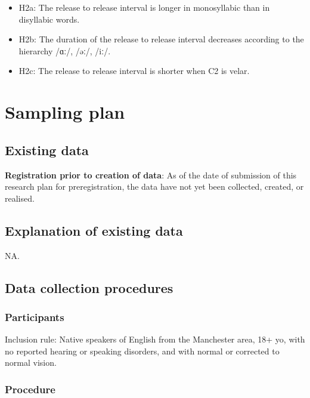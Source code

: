 \documentclass[11pt,]{article}
\providecommand{\tightlist}{%
  \setlength{\itemsep}{0pt}\setlength{\parskip}{0pt}}
\begin{document}
\begin{itemize}
\tightlist
\item
  H2a: The release to release interval is longer in monosyllabic than in
  disyllabic words.
\item
  H2b: The duration of the release to release interval decreases
  according to the hierarchy /ɑː/, /əː/, /iː/.
\item
  H2c: The release to release interval is shorter when C2 is velar.
\end{itemize}

\hypertarget{sampling-plan}{%
\section{Sampling plan}\label{sampling-plan}}

\hypertarget{existing-data}{%
\subsection{Existing data}\label{existing-data}}

\textbf{Registration prior to creation of data}: As of the date of
submission of this research plan for preregistration, the data have not
yet been collected, created, or realised.

\hypertarget{explanation-of-existing-data}{%
\subsection{Explanation of existing
data}\label{explanation-of-existing-data}}

NA.

\hypertarget{data-collection-procedures}{%
\subsection{Data collection
procedures}\label{data-collection-procedures}}

\hypertarget{participants}{%
\subsubsection{Participants}\label{participants}}

Inclusion rule: Native speakers of English from the Manchester area, 18+
yo, with no reported hearing or speaking disorders, and with normal or
corrected to normal vision.

\hypertarget{procedure}{%
\subsubsection{Procedure}\label{procedure}}
\end{document}
